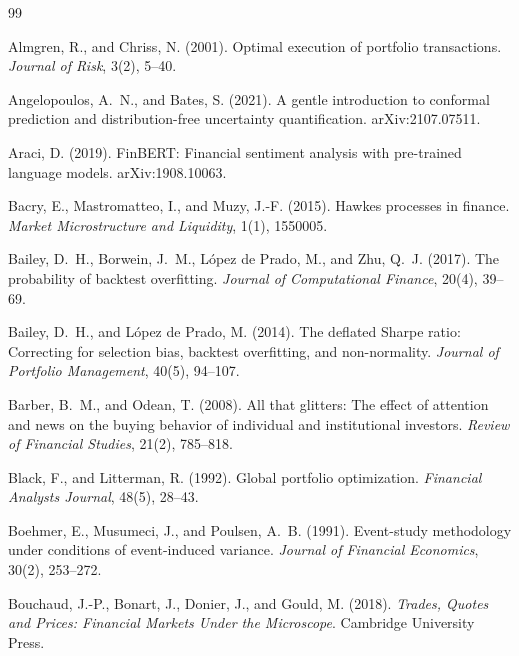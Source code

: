 \documentclass[11pt,a4paper]{article}
\theoremstyle{plain}
\theoremstyle{definition}
\begin{document}
\clearpage
\begin{thebibliography}{99}\small

Almgren, R., and Chriss, N. (2001). Optimal execution of portfolio transactions. \emph{Journal of Risk}, 3(2), 5--40.

Angelopoulos, A.~N., and Bates, S. (2021). A gentle introduction to conformal prediction and distribution-free uncertainty quantification. arXiv:2107.07511.

Araci, D. (2019). FinBERT: Financial sentiment analysis with pre-trained language models. arXiv:1908.10063.

Bacry, E., Mastromatteo, I., and Muzy, J.-F. (2015). Hawkes processes in finance. \emph{Market Microstructure and Liquidity}, 1(1), 1550005.

Bailey, D.~H., Borwein, J.~M., L\'opez de Prado, M., and Zhu, Q.~J. (2017). The probability of backtest overfitting. \emph{Journal of Computational Finance}, 20(4), 39--69.

Bailey, D.~H., and L\'opez de Prado, M. (2014). The deflated Sharpe ratio: Correcting for selection bias, backtest overfitting, and non-normality. \emph{Journal of Portfolio Management}, 40(5), 94--107.

Barber, B.~M., and Odean, T. (2008). All that glitters: The effect of attention and news on the buying behavior of individual and institutional investors. \emph{Review of Financial Studies}, 21(2), 785--818.

Black, F., and Litterman, R. (1992). Global portfolio optimization. \emph{Financial Analysts Journal}, 48(5), 28--43.

Boehmer, E., Musumeci, J., and Poulsen, A.~B. (1991). Event-study methodology under conditions of event-induced variance. \emph{Journal of Financial Economics}, 30(2), 253--272.

Bouchaud, J.-P., Bonart, J., Donier, J., and Gould, M. (2018). \emph{Trades, Quotes and Prices: Financial Markets Under the Microscope}. Cambridge University Press.


\end{thebibliography}
\end{document}
